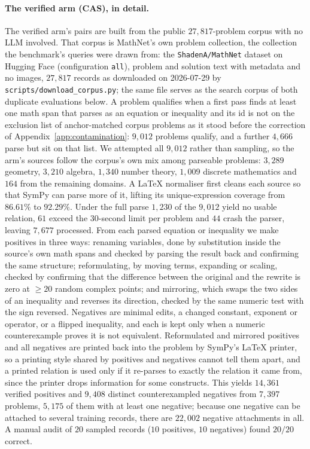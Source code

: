 \paragraph{The verified arm (CAS), in detail.}
The verified arm's pairs are built from the public $27{,}817$-problem corpus with no LLM involved. That corpus is MathNet's own problem collection, the collection the benchmark's queries were drawn from: the \texttt{ShadenA/MathNet} dataset on Hugging Face (configuration \texttt{all}), problem and solution text with metadata and no images, $27{,}817$ records as downloaded on 2026-07-29 by \texttt{scripts/download\_corpus.py}; the same file serves as the search corpus of both duplicate evaluations below. A problem qualifies when a first pass finds at least one math span that parses as an equation or inequality and its id is not on the exclusion list of anchor-matched corpus problems as it stood before the correction of Appendix~\ref{app:contamination}: $9{,}012$ problems qualify, and a further $4{,}666$ parse but sit on that list. We attempted all $9{,}012$ rather than sampling, so the arm's sources follow the corpus's own mix among parseable problems: $3{,}289$ geometry, $3{,}210$ algebra, $1{,}340$ number theory, $1{,}009$ discrete mathematics and $164$ from the remaining domains. A \LaTeX{} normaliser first cleans each source so that SymPy can parse more of it, lifting its unique-expression coverage from $86.61\%$ to $92.29\%$. Under the full parse $1{,}230$ of the $9{,}012$ yield no usable relation, $61$ exceed the $30$-second limit per problem and $44$ crash the parser, leaving $7{,}677$ processed. From each parsed equation or inequality we make positives in three ways: renaming variables, done by substitution inside the source's own math spans and checked by parsing the result back and confirming the same structure; reformulating, by moving terms, expanding or scaling, checked by confirming that the difference between the original and the rewrite is zero at ${\geq}20$ random complex points; and mirroring, which swaps the two sides of an inequality and reverses its direction, checked by the same numeric test with the sign reversed. Negatives are minimal edits, a changed constant, exponent or operator, or a flipped inequality, and each is kept only when a numeric counterexample proves it is not equivalent. Reformulated and mirrored positives and all negatives are printed back into the problem by SymPy's \LaTeX{} printer, so a printing style shared by positives and negatives cannot tell them apart, and a printed relation is used only if it re-parses to exactly the relation it came from, since the printer drops information for some constructs. This yields $14{,}361$ verified positives and $9{,}408$ distinct counterexampled negatives from $7{,}397$ problems, $5{,}175$ of them with at least one negative; because one negative can be attached to several training records, there are $22{,}002$ negative attachments in all. A manual audit of $20$ sampled records ($10$ positives, $10$ negatives) found $20/20$ correct.

